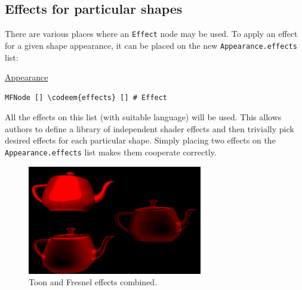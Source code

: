 \documentclass{egpubl}
\newenvironment{mycode}
{\begin{mycodecore}}
{\end{mycodecore}
\vspace{-0.1in}}
\newcommand*{\codeem}[1]{\textbf{#1}}
\begin{document}

\subsection{Effects for particular shapes}

There are various places where an \texttt{Effect} node may be used.
To apply an effect for a given shape appearance, it can be placed
on the new \texttt{Appearance.effects} list:

\begin{mycode}
\underline{Appearance}
\begin{Verbatim}[commandchars=\\\{\},fontsize=\small]
MFNode [] \codeem{effects} [] # Effect
\end{Verbatim}
\end{mycode}

All the effects on this list (with suitable language) will be used.
This allows authors to define a library of independent shader effects
and then trivially pick desired effects for each particular shape.
Simply placing two effects on the \texttt{Appearance.effects} list
makes them cooperate correctly.

\begin{figure}[H]
  \centering
  \includegraphics[width=3in]{fresnel_and_toon}
  \caption{Toon and Fresnel effects combined.}
\end{figure}
\end{document}
